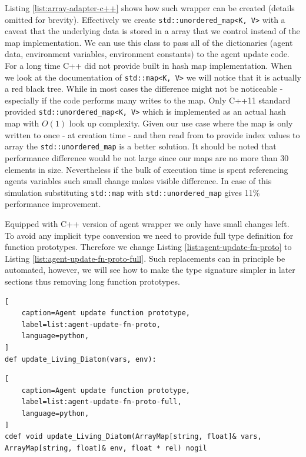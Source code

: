 \documentclass[12pt, a4paper]{report}
\begin{document}
Listing \ref{list:array-adapter-c++} shows how such wrapper can be created
(details omitted for brevity). Effectively we create \lstinline{std::unordered_map<K, V>}
with a caveat that the underlying data is stored in a array that we control
instead of the map implementation. We can use this class to pass all of the
dictionaries (agent data, environment variables, environment constants) to
the agent update code. For a long time C++ did not provide built in hash map
implementation. When we look at the documentation of \lstinline{std::map<K, V>}
we will notice that it is actually a red black tree. While in most cases
the difference might not be noticeable - especially if the code performs
many writes to the map. Only C++11 standard provided \lstinline{std::unordered_map<K, V>}
which is implemented as an actual hash map with $O(1)$ look up complexity. Given our use case
where the map is only written to once - at creation time - and then
read from to provide index values to array the \lstinline{std::unordered_map} is
a better solution. It should be noted that performance difference would be not large
since our maps are no more than 30 elements in size. Nevertheless if the bulk of
execution time is spent referencing agents variables such small change makes
visible difference. In case of this simulation substituting \lstinline{std::map} with
\lstinline{std::unordered_map} gives 11\% performance improvement.

Equipped with C++ version of agent wrapper we only have small changes left.
To avoid any implicit type conversion we need to provide full type definition
for function prototypes. Therefore we change Listing \ref{list:agent-update-fn-proto}
to Listing \ref{list:agent-update-fn-proto-full}. Such replacements can in principle be
automated, however, we will see how to make the type signature simpler in later sections
thus removing long function prototypes.

\begin{lstlisting}[
    caption=Agent update function prototype,
    label=list:agent-update-fn-proto,
    language=python,
]
def update_Living_Diatom(vars, env):
\end{lstlisting}

\begin{lstlisting}[
    caption=Agent update function prototype,
    label=list:agent-update-fn-proto-full,
    language=python,
]
cdef void update_Living_Diatom(ArrayMap[string, float]& vars, ArrayMap[string, float]& env, float * rel) nogil
\end{lstlisting}
\end{document}
